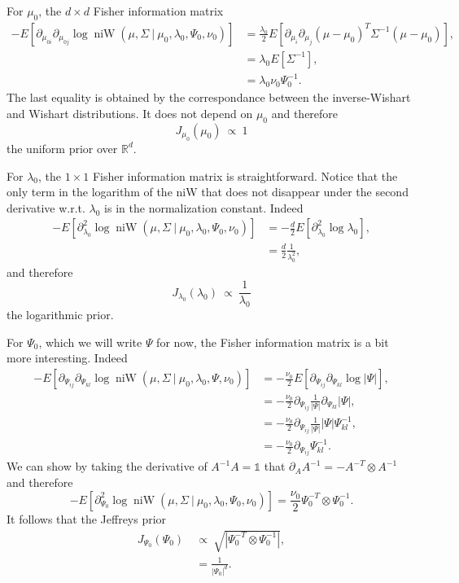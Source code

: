 \documentclass[11pt, oneside]{article}   	%
\DeclareMathOperator{\niW}{niW}
\begin{document}
For $\mu_0$, the $d\times d$ Fisher information matrix
\begin{equation}\begin{split}
-E\left[\partial_{\mu_{0i}}\partial_{\mu_{0j}} \log \niW(\mu,\Sigma~\vert~\mu_0,\lambda_0,\Psi_0,\nu_0)\right] &= \frac{\lambda_0}{2}E[\partial_{\mu_i}\partial_{\mu_j}(\mu - \mu_0)^T\Sigma^{-1}(\mu - \mu_0)],\\
&= \lambda_0 E[\Sigma^{-1}],\\
&= \lambda_0\nu_0\Psi_0^{-1}.
\end{split}\end{equation}
The last equality is obtained by the correspondance between the inverse-Wishart and Wishart distributions. It does not depend on $\mu_0$ and therefore
$$J_{\mu_0}(\mu_0)~\propto~1$$
the uniform prior over $\mathbb{R}^d$.

For $\lambda_0$, the $1\times 1$ Fisher information matrix is straightforward. Notice that the only term in the logarithm of the niW that does not disappear under the second derivative w.r.t. $\lambda_0$ is in the normalization constant. Indeed
\begin{equation}\begin{split}
-E\left[\partial^2_{\lambda_0}\log \niW(\mu,\Sigma~\vert~\mu_0,\lambda_0,\Psi_0,\nu_0)\right] &= -\frac{d}{2}E[\partial^2_{\lambda_0}\log \lambda_0],\\
&= \frac{d}{2}\frac{1}{\lambda_0^2},
\end{split}\end{equation}
and therefore
$$J_{\lambda_0}(\lambda_0)~\propto~\frac{1}{\lambda_0}$$
the logarithmic prior.

For $\Psi_0$, which we will write $\Psi$ for now, the Fisher information matrix is a bit more interesting. Indeed
\begin{equation}\begin{split}
-E\left[\partial_{\Psi_{ij}}\partial_{\Psi_{kl}}\log \niW(\mu,\Sigma~\vert~\mu_0,\lambda_0,\Psi,\nu_0)\right] &= -\frac{\nu_0}{2}E[\partial_{\Psi_{ij}}\partial_{\Psi_{kl}}\log\vert\Psi\vert], \\
&=-\frac{\nu_0}{2}\partial_{\Psi_{ij}}\frac{1}{\vert\Psi\vert}\partial_{\Psi_{kl}}\vert\Psi\vert,\\
&= -\frac{\nu_0}{2}\partial_{\Psi_{ij}}\frac{1}{\vert\Psi\vert}\vert\Psi\vert \Psi^{-1}_{kl},\\
&=-\frac{\nu_0}{2} \partial_{\Psi_{ij}}\Psi_{kl}^{-1}.
\end{split}\end{equation}
We can show by taking the derivative of $A^{-1} A = \mathbb{1}$ that $\partial_A A^{-1} = -A^{-
T}\otimes A^{-1}$ and therefore
$$-E\left[\partial^2_{\Psi_{0}}\log \niW(\mu,\Sigma~\vert~\mu_0,\lambda_0,\Psi_0,\nu_0)\right] = \frac{\nu_0}{2}\Psi_0^{-T}\otimes\Psi_0^{-1}.$$
It follows that the Jeffreys prior
\begin{equation}\begin{split}
J_{\Psi_0}(\Psi_0)~&\propto~ \sqrt{\left\vert\Psi_0^{-T}\otimes\Psi_0^{-1}\right\vert},\\
&= \frac{1}{\left\vert\Psi_0\right\vert^d}.
\end{split}\label{eq:jeffpsi}\end{equation}
\end{document}
